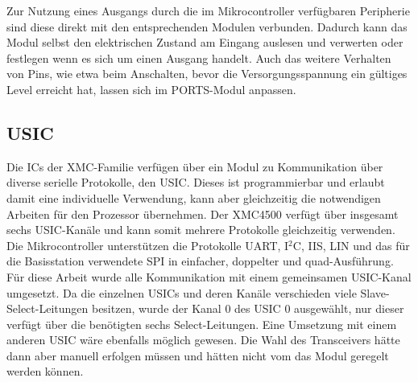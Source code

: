 Zur Nutzung eines Ausgangs durch die im Mikrocontroller verfügbaren Peripherie sind diese direkt mit den entsprechenden Modulen verbunden. Dadurch kann das Modul selbst den elektrischen Zustand am Eingang auslesen und verwerten oder festlegen wenn es sich um einen Ausgang handelt\cite{XMC-Reference}. 
Auch das weitere Verhalten von Pins, wie etwa  beim Anschalten, bevor die Versorgungsspannung ein gültiges Level erreicht hat, lassen sich im PORTS-Modul anpassen.

\subsection{USIC}
Die \acp{IC} der XMC-Familie verfügen über ein Modul zu Kommunikation über diverse serielle Protokolle, den \acf{USIC}. Dieses ist programmierbar und erlaubt damit eine individuelle Verwendung, kann aber gleichzeitig die notwendigen Arbeiten für den Prozessor übernehmen. Der XMC4500 verfügt über insgesamt sechs \ac{USIC}-Kanäle und kann somit mehrere Protokolle gleichzeitig verwenden. Die Mikrocontroller unterstützen die  Protokolle UART, I$^{2}$C, IIS, LIN und das für die Basisstation verwendete SPI in einfacher, doppelter und quad-Ausführung. Für diese Arbeit wurde alle Kommunikation mit einem gemeinsamen \acs{USIC}-Kanal umgesetzt. Da die einzelnen \acp{USIC} und deren Kanäle verschieden viele Slave-Select-Leitungen besitzen, wurde der Kanal $0$ des \ac{USIC} $0$ ausgewählt, nur dieser verfügt über die benötigten sechs Select-Leitungen. Eine Umsetzung mit einem anderen USIC wäre ebenfalls möglich gewesen. Die Wahl des Transceivers hätte dann aber manuell erfolgen müssen und hätten nicht vom das Modul geregelt werden können.


